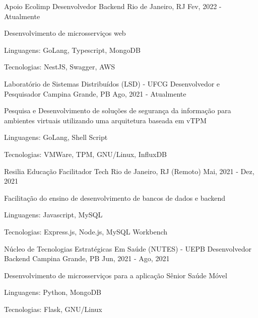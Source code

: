 
\begin{cventries}
  \cventry
  {Apoio Ecolimp} %
  {Desenvolvedor Backend} %
  {Rio de Janeiro, RJ} %
  {Fev, 2022 - Atualmente} %
  {
    \begin{cvitems} %
      \item {Desenvolvimento de microsserviços web}
      \item {Linguagens: GoLang, Typescript, MongoDB}
      \item {Tecnologias: NestJS, Swagger, AWS}
    \end{cvitems}
  }


  \cventry
  {Laboratório de Sistemas Distribuídos (LSD) - UFCG} %
  {Desenvolvedor e Pesquisador} %
  {Campina Grande, PB} %
  {Ago, 2021 - Atualmente} %
  {
    \begin{cvitems} %
      \item {Pesquisa e Desenvolvimento de soluções de segurança da informação para ambientes virtuais utilizando uma arquitetura baseada em vTPM}
      \item {Linguagens: GoLang, Shell Script}
      \item {Tecnologias: VMWare, TPM, GNU/Linux, InfluxDB}
    \end{cvitems}
  }

  \cventry
  {Resilia Educação} %
  {Facilitador Tech} %
  {Rio de Janeiro, RJ (Remoto)} %
  {Mai, 2021 - Dez, 2021} %
  {
    \begin{cvitems} %
      \item {Facilitação do ensino de desenvolvimento de bancos de dados e backend}
      \item {Linguagens: Javascript, MySQL}
      \item {Tecnologias: Express.js, Node.js, MySQL Workbench}
    \end{cvitems}
  }

  \cventry
  {Núcleo de Tecnologias Estratégicas Em Saúde (NUTES) - UEPB} %
  {Desenvolvedor Backend} %
  {Campina Grande, PB} %
  {Jun, 2021 - Ago, 2021} %
  {
    \begin{cvitems} %
      \item {Desenvolvimento de microsserviços para a aplicação Sênior Saúde Móvel}
      \item {Linguagens: Python, MongoDB}
      \item {Tecnologias: Flask, GNU/Linux}
    \end{cvitems}
  }


\end{cventries}
